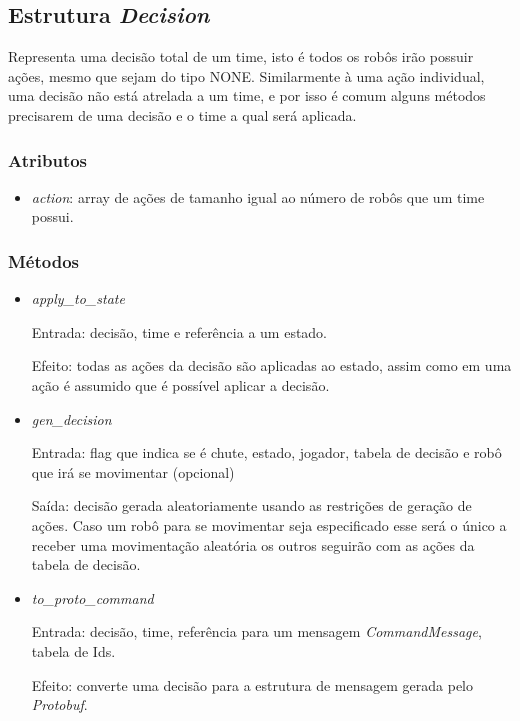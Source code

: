 \subsection*{Estrutura \textit{Decision}}

Representa uma decisão total de um time, isto é todos os robôs irão possuir
ações, mesmo que sejam do tipo NONE.  Similarmente à uma ação individual, uma
decisão não está atrelada a um time, e por isso é comum alguns métodos
precisarem de uma decisão e o time a qual será aplicada.

\subsubsection*{Atributos}

\begin{itemize}
  \item \textit{action}: array de ações de tamanho igual ao número de robôs que
    um time possui.
\end{itemize}

\subsubsection*{Métodos}

\begin{itemize}
  \item \textit{apply_to_state}
    \par Entrada: decisão, time e referência a um estado.
    \par Efeito: todas as ações da decisão são aplicadas ao estado, assim como
    em uma ação é assumido que é possível aplicar a decisão.
  \item \textit{gen_decision}
    \par Entrada: flag que indica se é chute, estado, jogador, tabela de decisão
    e robô que irá se movimentar (opcional)
    \par Saída: decisão gerada aleatoriamente usando as restrições de geração de
    ações.  Caso um robô para se movimentar seja especificado esse será o único
    a receber uma movimentação aleatória os outros seguirão com as ações da
    tabela de decisão.
  \item \textit{to_proto_command}
    \par Entrada: decisão, time, referência para um mensagem
    \textit{CommandMessage}, tabela de Ids.
    \par Efeito: converte uma decisão para a estrutura de mensagem gerada pelo
    \textit{Protobuf}.
\end{itemize}

